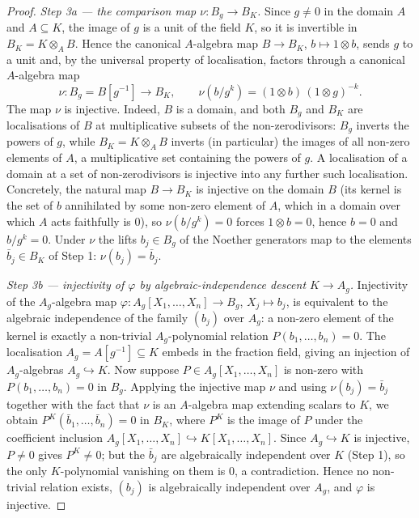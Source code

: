 \begin{proof}
  \emph{Step 3a — the comparison map \(\nu : B_g \to B_K\).} Since \(g \ne 0\) in the
  domain \(A\) and \(A \subseteq K\), the image of \(g\) is a unit of the field \(K\), so
  it is invertible in \(B_K = K \otimes_A B\). Hence the canonical \(A\)-algebra map
  \(B \to B_K\), \(b \mapsto 1 \otimes b\), sends \(g\) to a unit and, by the universal
  property of localisation, factors through a canonical \(A\)-algebra map
  \[
    \nu : B_g = B[g^{-1}] \longrightarrow B_K, \qquad \nu(b/g^k) = (1 \otimes b)\,(1 \otimes g)^{-k}.
  \]
  The map \(\nu\) is injective. Indeed, \(B\) is a domain, and both \(B_g\) and \(B_K\) are
  localisations of \(B\) at multiplicative subsets of the non-zerodivisors: \(B_g\) inverts
  the powers of \(g\), while \(B_K = K \otimes_A B\) inverts (in particular) the images of
  all non-zero elements of \(A\), a multiplicative set containing the powers of \(g\). A
  localisation of a domain at a set of non-zerodivisors is injective into any further such
  localisation. Concretely, the natural map \(B \to B_K\) is injective on the domain \(B\)
  (its kernel is the set of \(b\) annihilated by some non-zero element of \(A\), which in a
  domain over which \(A\) acts faithfully is \(0\)), so \(\nu(b/g^k) = 0\) forces
  \(1 \otimes b = 0\), hence \(b = 0\) and \(b/g^k = 0\). Under \(\nu\) the lifts
  \(b_j \in B_g\) of the Noether generators map to the elements \(\bar b_j \in B_K\) of
  Step 1: \(\nu(b_j) = \bar b_j\).

  \emph{Step 3b — injectivity of \(\varphi\) by algebraic-independence descent
  \(K \to A_g\).} Injectivity of the \(A_g\)-algebra map
  \(\varphi : A_g[X_1, \dots, X_n] \to B_g\), \(X_j \mapsto b_j\), is equivalent to the
  algebraic independence of the family \((b_j)\) over \(A_g\): a non-zero element of the
  kernel is exactly a non-trivial \(A_g\)-polynomial relation \(P(b_1, \dots, b_n) = 0\).
  The localisation \(A_g = A[g^{-1}] \subseteq K\) embeds in the fraction field, giving an
  injection of \(A_g\)-algebras \(A_g \hookrightarrow K\). Now suppose
  \(P \in A_g[X_1, \dots, X_n]\) is non-zero with \(P(b_1, \dots, b_n) = 0\) in \(B_g\).
  Applying the injective map \(\nu\) and using \(\nu(b_j) = \bar b_j\) together with the fact
  that \(\nu\) is an \(A\)-algebra map extending scalars to \(K\), we obtain
  \(P^K(\bar b_1, \dots, \bar b_n) = 0\) in \(B_K\), where \(P^K\) is the image of \(P\)
  under the coefficient inclusion \(A_g[X_1, \dots, X_n] \hookrightarrow K[X_1, \dots, X_n]\).
  Since \(A_g \hookrightarrow K\) is injective, \(P \ne 0\) gives \(P^K \ne 0\); but the
  \(\bar b_j\) are algebraically independent over \(K\) (Step 1), so the only \(K\)-polynomial
  vanishing on them is \(0\), a contradiction. Hence no non-trivial relation exists, \((b_j)\)
  is algebraically independent over \(A_g\), and \(\varphi\) is injective.


\end{proof}
